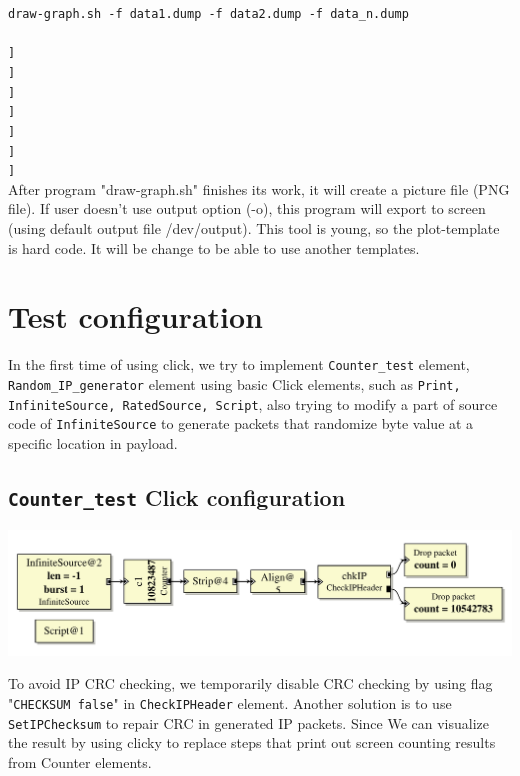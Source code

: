 \documentclass[a4paper]{article}
\begin{document}
\begin{enumerate}
\begin{flushleft}
\texttt{draw-graph.sh -f data1.dump -f data2.dump -f data\_n.dump\\
[-o PNG\_FILES]\\
      [[--plot-type COUNT (default) | RATE | DENSITY]]\\
      [[--xrange 233:23221]]\\
      [[--yrange 282:2922]]\\
      [[--xlabel XYZ]]\\
      [[--ylabel ABC]]\\
      [[--xcol 2]]\\
      [[--ycol 1]]}\\
  After program "draw-graph.sh" finishes its work, it will create a picture file (PNG file). If user doesn't use output option (-o), this program will export to screen (using default output file /dev/output). This tool is young, so the plot-template is hard code. It will be change to be able to use another templates.\end{flushleft}
      \end{enumerate}  
  \section{Test configuration}
  In the first time of using click, we try to implement \texttt{Counter\_test} element, \texttt{Random\_IP\_generator} element using basic Click elements, such as \texttt{Print, InfiniteSource, RatedSource, Script}, also trying to modify a part of source code of \texttt{InfiniteSource} to generate packets that randomize byte value at a specific location in payload.
  \subsection{\texttt{Counter\_test} Click configuration}
  \begin{center}
	  \includegraphics[scale=0.6]{counter_test.pdf}
	  \label{fig:countertest}
  \end{center}
  To avoid IP CRC checking, we temporarily disable CRC checking by using flag "\texttt{CHECKSUM false}" in \texttt{CheckIPHeader} element. Another solution is to use \texttt{SetIPChecksum} to repair CRC in generated IP packets. Since We can visualize the result by using clicky to replace steps that print out screen counting results from Counter elements. 
\end{document}
